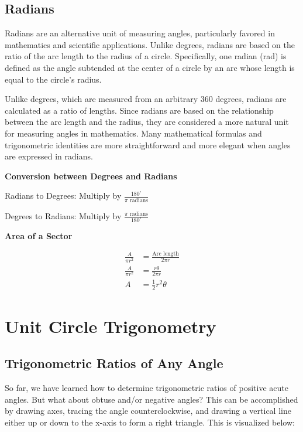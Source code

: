 \documentclass[11pt]{article}
\begin{document}
\subsection{Radians}

Radians are an alternative unit of measuring angles, particularly favored in mathematics and scientific applications. Unlike degrees, radians are based on the ratio of the arc length to the radius of a circle. Specifically, one radian (rad) is defined as the angle subtended at the center of a circle by an arc whose length is equal to the circle's radius.

Unlike degrees, which are measured from an arbitrary 360 degrees, radians are calculated as a ratio of lengths. Since radians are based on the relationship between the arc length and the radius, they are considered a more natural unit for measuring angles in mathematics. Many mathematical formulas and trigonometric identities are more straightforward and more elegant when angles are expressed in radians.

\textbf{Conversion between Degrees and Radians}

Radians to Degrees: Multiply by $\frac{180^\circ}{\pi\text{ radians}}$

Degrees to Radians: Multiply by $\frac{\pi\text{ radians}}{180^\circ}$

\textbf{Area of a Sector}

\begin{align*}
    \frac{A}{\pi r^2} &= \frac{\text{Arc length}}{2\pi r} \\
    \frac{A}{\pi r^2} &= \frac{r\theta}{2\pi r} \\  
    A &= \frac{1}{2}r^2 \theta
\end{align*}

\section{Unit Circle Trigonometry}

\subsection{Trigonometric Ratios of Any Angle}
So far, we have learned how to determine trigonometric ratios of positive acute angles. But what about obtuse and/or negative angles? This can be accomplished by drawing axes, tracing the angle counterclockwise, and drawing a vertical line either up or down to the x-axis to form a right triangle. This is visualized below:
\end{document}
